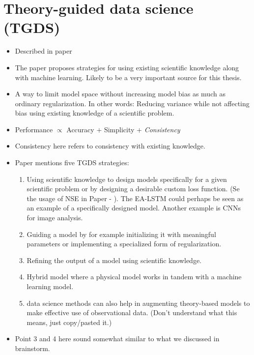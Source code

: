 \documentclass[a4paper,12pt,english]{article}
\begin{document}
\section*{Theory-guided data science (TGDS)}
\begin{itemize}
\item Described in paper \cite{hybrid_paper}
\item The paper proposes strategies for using existing scientific knowledge along with machine learning. Likely to be a very important source for this thesis.
\item A way to limit model space without increasing model bias as much as ordinary regularization. In other words: Reducing variance while not affecting bias using existing knowledge of a scientific problem.
\item Performance $\propto$ Accuracy $+$ Simplicity $+$ \textit{Consistency}
\item Consistency here refers to consistency with existing knowledge.
\item Paper mentions five TGDS strategies:
\begin{enumerate}
\item Using scientific knowledge to design models specifically for a given scientific problem or by designing a desirable custom loss function. (Se the usage of NSE in Paper \cite{lstm_first_paper} - \cite{lstm_third_paper}). The EA-LSTM could perhaps be seen as an example of a specifically designed model. Another example is CNNs for image analysis.
\item Guiding a model by for example initializing it with meaningful parameters or implementing a specialized form of regularization.
\item Refining the output of a model using scientific knowledge.
\item Hybrid model where a physical model works in tandem with a machine learning model. 
\item data science methods can also help in augmenting theory-based models to make effective use of observational data. (Don't understand what this means, just copy/pasted it.)
\end{enumerate}
\item Point 3 and 4 here sound somewhat similar to what we discussed in brainstorm.
\end{itemize}
\end{document}
